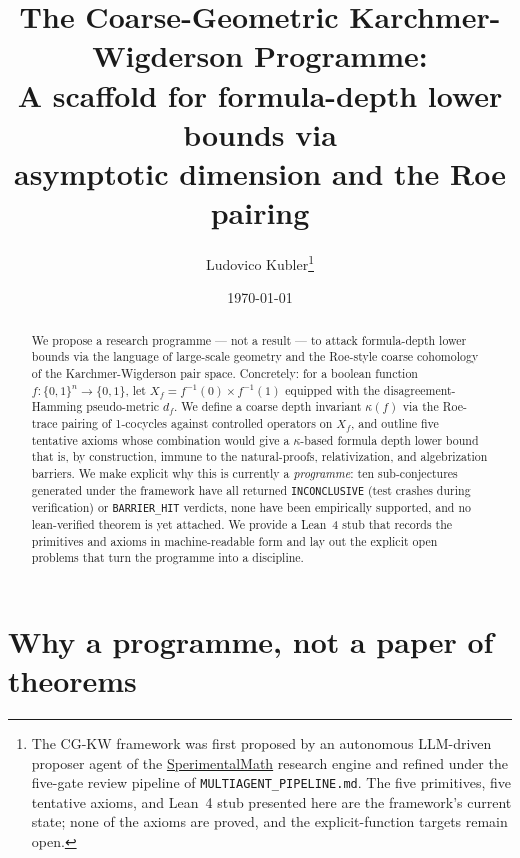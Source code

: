 \documentclass[11pt,a4paper]{article}
\title{The Coarse-Geometric Karchmer-Wigderson Programme:\\
A scaffold for formula-depth lower bounds via\\
asymptotic dimension and the Roe pairing}
\author{Ludovico Kubler\thanks{The CG-KW framework was first proposed
by an autonomous LLM-driven proposer agent of the
\href{https://github.com/ludwigkubler/SperimentalMath}{SperimentalMath}
research engine and refined under the five-gate review pipeline of
\texttt{MULTIAGENT\_PIPELINE.md}. The five primitives, five tentative
axioms, and Lean~4 stub presented here are the framework's current state;
none of the axioms are proved, and the explicit-function targets remain
open.}}
\date{\today}
\begin{document}
\maketitle

\begin{abstract}
We propose a research programme — not a result — to attack
formula-depth lower bounds via the language of large-scale geometry and
the Roe-style coarse cohomology of the Karchmer-Wigderson pair space.
Concretely: for a boolean function $f \colon \{0,1\}^n \to \{0,1\}$,
let $X_f = f^{-1}(0) \times f^{-1}(1)$ equipped with the disagreement-
Hamming pseudo-metric $d_f$. We define a coarse depth invariant
$\kappa(f)$ via the Roe-trace pairing of 1-cocycles against
controlled operators on $X_f$, and outline five tentative axioms whose
combination would give a $\kappa$-based formula depth lower bound that
is, by construction, immune to the natural-proofs, relativization, and
algebrization barriers. We make explicit why this is currently a
\emph{programme}: ten sub-conjectures generated under the framework
have all returned \texttt{INCONCLUSIVE} (test crashes during
verification) or \texttt{BARRIER\_HIT} verdicts, none have been
empirically supported, and no lean-verified theorem is yet attached. We
provide a Lean~4 stub that records the primitives and axioms in
machine-readable form and lay out the explicit open problems that turn
the programme into a discipline.
\end{abstract}

\section{Why a programme, not a paper of theorems}\label{sec:why}
\end{document}
